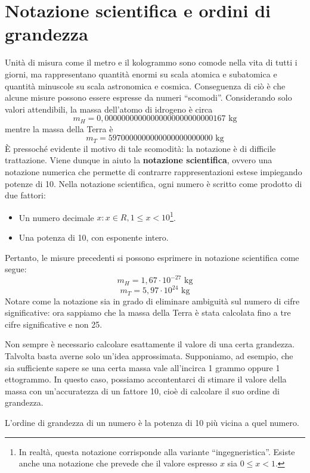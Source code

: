 \section{Notazione scientifica e ordini di grandezza}
Unità di misura come il metro e il kologrammo sono comode nella vita di tutti i
giorni, ma rappresentano quantità enormi su scala atomica e subatomica e quantità
minuscole su scala astronomica e cosmica. Conseguenza di ciò è che alcune misure
possono essere espresse da numeri ``scomodi''. Considerando solo valori attendibili,
la massa dell'atomo di idrogeno è circa
\[ m_H = 0,000 000 000 000 000 000 000 000 001 67 \text{ kg} \]
mentre la massa della Terra è
\[ m_T = 5 970 000 000 000 000 000 000 000 \text{ kg} \]
È pressoché evidente il motivo di tale scomodità: la notazione è di difficile
trattazione. Viene dunque in aiuto la \textbf{notazione scientifica}, ovvero una
notazione numerica che permette di contrarre rappresentazioni estese impiegando
potenze di 10. Nella notazione scientifica, ogni numero è scritto come prodotto
di due fattori:
\begin{itemize}
    \item Un numero decimale $x:x\in R, 1\leq x < 10$\footnote{In realtà, questa notazione corrisponde alla variante ``ingegneristica''. Esiste anche una notazione che prevede che il valore espresso $x$ sia $0\leq x < 1$.}.
    \item Una potenza di 10, con esponente intero.
\end{itemize}
Pertanto, le misure precedenti si possono esprimere in notazione scientifica come
segue:
\[ m_H = 1,67 \cdot 10^{-27} \text{ kg} \]
\[ m_T = 5,97 \cdot 10^{24} \text{ kg}\]
Notare come la notazione sia in grado di eliminare ambiguità sul numero di cifre
significative: ora sappiamo che la massa della Terra è stata calcolata fino a
tre cifre significative e non 25.

Non sempre è necessario calcolare esattamente il valore di una certa grandezza.
Talvolta basta averne solo un'idea approssimata. Supponiamo, ad esempio, che sia
sufficiente sapere se una certa massa vale all'incirca 1 grammo oppure 1
ettogrammo. In questo caso, possiamo accontentarci di stimare il valore della
massa con un'accuratezza di un fattore 10, cioè di calcolare il suo ordine di
grandezza.

\vspace{8pt}
\begin{tcolorbox}[colback = yellow!30, colframe = yellow!30!black, title = {Ordine di grandezza}]
L'ordine di grandezza di un numero è la potenza di 10 più vicina a quel numero.
\end{tcolorbox}
\vspace{5pt}

